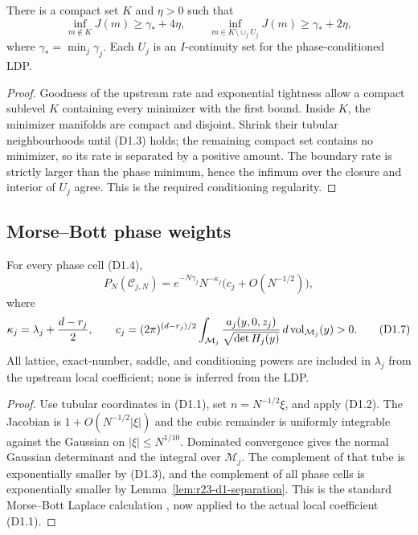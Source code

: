 \begin{lemma}
\label{lem:r23-d1-separation}
There is a compact set $K$ and $\eta>0$ such that
\[
 \inf_{m\notin K}J(m)\ge\gamma_*+4\eta,
 \qquad
 \inf_{m\in K\setminus\cup_jU_j}J(m)\ge\gamma_*+2\eta, \tag{D1.5}
\]
where $\gamma_*=\min_j\gamma_j$.  Each $U_j$ is an
$I$-continuity set for the phase-conditioned LDP.
\end{lemma}

\begin{proof}
Goodness of the upstream rate and exponential tightness allow a compact
sublevel $K$ containing every minimizer with the first bound.  Inside $K$, the
minimizer manifolds are compact and disjoint.  Shrink their tubular
neighbourhoods until (D1.3) holds; the remaining compact set contains no
minimizer, so its rate is separated by a positive amount.  The boundary rate
is strictly larger than the phase minimum, hence the infimum over the closure
and interior of $U_j$ agree.  This is the required conditioning regularity.
\end{proof}

\subsection{Morse--Bott phase weights}

\begin{theorem}
\label{thm:r23-d1-weights}
For every phase cell (D1.4),
\[
 P_N(\mathcal C_{j,N})
 =e^{-N\gamma_j}N^{-\kappa_j}
 \bigl(c_j+O(N^{-1/2})\bigr),                             \tag{D1.6}
\]
where
\[
 \kappa_j=\lambda_j+{d-r_j\over2},
 \qquad
 c_j=(2\pi)^{(d-r_j)/2}
 \int_{\mathcal M_j}{a_j(y,0,z_j)\over
       \sqrt{\det H_j(y)}}\,d\operatorname{vol}_{\mathcal M_j}(y)>0.  \tag{D1.7}
\]
All lattice, exact-number, saddle, and conditioning powers are included in
$\lambda_j$ from the upstream local coefficient; none is inferred from the
LDP.
\end{theorem}

\begin{proof}
Use tubular coordinates in (D1.1), set $n=N^{-1/2}\xi$, and apply (D1.2).
The Jacobian is $1+O(N^{-1/2}|\xi|)$ and the cubic remainder is uniformly
integrable against the Gaussian on $|\xi|\le N^{1/10}$.  Dominated convergence
gives the normal Gaussian determinant and the integral over
$\mathcal M_j$.  The complement of that tube is exponentially smaller by
(D1.3), and the complement of all phase cells is exponentially smaller by
Lemma~\ref{lem:r23-d1-separation}.  This is the standard Morse--Bott Laplace
calculation \cite{Wong2001}, now applied to the actual local coefficient
(D1.1).
\end{proof}

